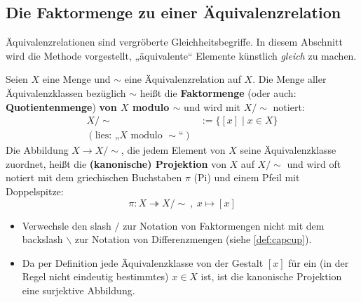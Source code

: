 \subsection*{Die Faktormenge zu einer Äquivalenzrelation}


Äquivalenzrelationen sind vergröberte Gleichheitsbegriffe. In diesem Abschnitt wird die Methode vorgestellt, „äquivalente“ Elemente künstlich \emph{gleich} zu machen.


\begin{defin} \label{def:faktormenge}   
    Seien $X$ eine Menge und $\sim$ eine Äquivalenzrelation auf $X$. Die Menge aller Äquivalenzklassen bezüglich $\sim$ heißt die \textbf{Faktormenge} (oder auch: \textbf{Quotientenmenge}) \textbf{von $X$ modulo $\sim$} und wird mit $X/{\sim}$ notiert:
    \begin{align*}
        X/{\sim} & := \big\{ [x] \mid x\in X \big\} \\
        (\text{lies: „$X$ modulo ${\sim}$“}) &
    \end{align*}
    Die Abbildung $X\to X/{\sim}$, die jedem Element von $X$ seine Äquivalenzklasse zuordnet, heißt die \textbf{(kanonische) Projektion} von $X$ auf $X/{\sim}$ und wird oft notiert mit dem griechischen Buchstaben $\pi$ (Pi) und einem Pfeil mit Doppelspitze:
        \[ \pi : X \twoheadrightarrow X/{\sim}\ ,\ x \mapsto [x] \]
\end{defin}


\begin{bem} \quad
    \begin{itemize}
        \item Verwechsle den slash $\slash$ zur Notation von Faktormengen nicht mit dem backslash $\backslash$ zur Notation von Differenzmengen (siehe \cref{def:capcup}).
        \item Da per Definition jede Äquivalenzklasse von der Gestalt $[x]$ für ein (in der Regel nicht eindeutig bestimmtes) $x\in X$ ist, ist die kanonische Projektion eine surjektive Abbildung.
    \end{itemize}
\end{bem}


